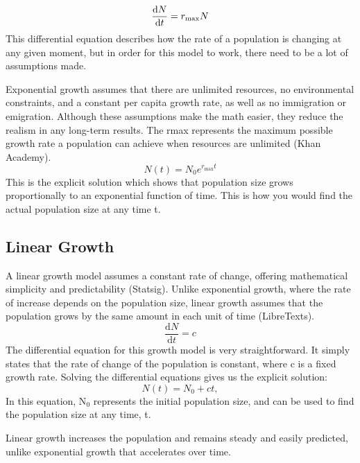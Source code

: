 \documentclass{article}
\begin{document}
\begin{equation}
    \centering
     \frac{\mathrm{d}N}{\mathrm{d}t} = r_{\max} N
\end{equation}
This differential equation describes how the rate of a population is changing at any given moment, but in order for this model to work, there need to be a lot of assumptions made. 

Exponential growth assumes that there are unlimited resources, no environmental constraints, and a constant per capita growth rate, as well as no immigration or emigration. Although these assumptions make the math easier, they reduce the realism in any long-term results. The r{max} represents the maximum possible growth rate a population can achieve when resources are unlimited (Khan Academy). 
\begin{equation}
N(t) = N_0 e^{r_{\max} t}
\end{equation}
This is the explicit solution which shows that population size grows proportionally to an exponential function of time. This is how you would find the actual population size at any time t.
\subsection{Linear Growth}
A linear growth model assumes a constant rate of change, offering mathematical simplicity and predictability (Statsig). Unlike exponential growth, where the rate of increase depends on the population size, linear growth assumes that the population grows by the same amount in each unit of time (LibreTexts).
\begin{equation}
\frac{\mathrm{d}N}{\mathrm{d}t} = c
\end{equation}
The differential equation for this growth model is very straightforward. It simply states that the rate of change of the population is constant, where c is a fixed growth rate. Solving the differential equations gives us the explicit solution:
\begin{equation}
N(t) = N_0 + ct,
\end{equation}
In this equation, N$_0$ represents the initial population size, and can be used to find the population size at any time, t. 

Linear growth increases the population and remains steady and easily predicted, unlike exponential growth that accelerates over time. 
\end{document}
